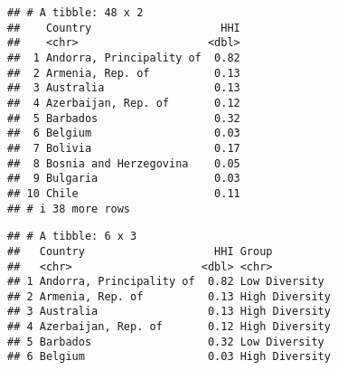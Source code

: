 \documentclass[
]{article}
\newenvironment{Shaded}{\begin{snugshade}}{\end{snugshade}}
\newcommand{\AttributeTok}[1]{\textcolor[rgb]{0.77,0.63,0.00}{#1}}
\newcommand{\FloatTok}[1]{\textcolor[rgb]{0.00,0.00,0.81}{#1}}
\newcommand{\FunctionTok}[1]{\textcolor[rgb]{0.00,0.00,0.00}{#1}}
\newcommand{\NormalTok}[1]{#1}
\newcommand{\OtherTok}[1]{\textcolor[rgb]{0.56,0.35,0.01}{#1}}
\newcommand{\SpecialCharTok}[1]{\textcolor[rgb]{0.00,0.00,0.00}{#1}}
\newcommand{\StringTok}[1]{\textcolor[rgb]{0.31,0.60,0.02}{#1}}
\begin{document}
\begin{verbatim}
## # A tibble: 48 x 2
##    Country                    HHI
##    <chr>                    <dbl>
##  1 Andorra, Principality of  0.82
##  2 Armenia, Rep. of          0.13
##  3 Australia                 0.13
##  4 Azerbaijan, Rep. of       0.12
##  5 Barbados                  0.32
##  6 Belgium                   0.03
##  7 Bolivia                   0.17
##  8 Bosnia and Herzegovina    0.05
##  9 Bulgaria                  0.03
## 10 Chile                     0.11
## # i 38 more rows
\end{verbatim}

\begin{Shaded}
\end{Shaded}

\begin{verbatim}
## # A tibble: 6 x 3
##   Country                    HHI Group         
##   <chr>                    <dbl> <chr>         
## 1 Andorra, Principality of  0.82 Low Diversity 
## 2 Armenia, Rep. of          0.13 High Diversity
## 3 Australia                 0.13 High Diversity
## 4 Azerbaijan, Rep. of       0.12 High Diversity
## 5 Barbados                  0.32 Low Diversity 
## 6 Belgium                   0.03 High Diversity
\end{verbatim}

\begin{Shaded}
\end{Shaded}
\end{document}

